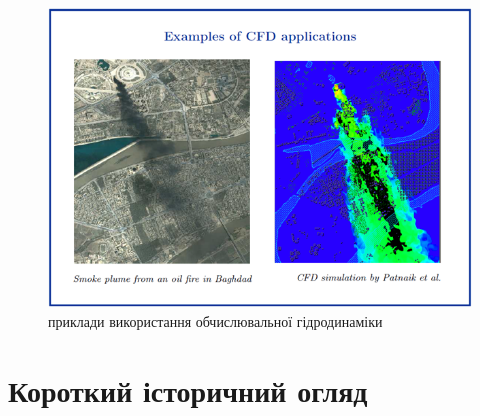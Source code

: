 \begin{figure}[H]
    \centering
    \includegraphics[width=.9\textwidth]{img/01/4.png}
    \caption{приклади використання обчислювальної гідродинаміки}
\end{figure} 

\section{Короткий історичний огляд}

